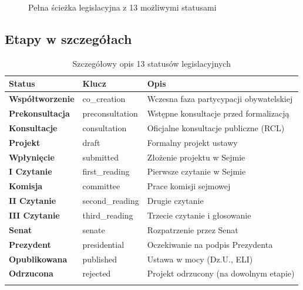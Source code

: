 \documentclass[12pt,a4paper]{article}
\begin{document}
\begin{figure}[H]
\caption{Pełna ścieżka legislacyjna z 13 możliwymi statusami}
\label{fig:legislative}
\end{figure}

\subsection{Etapy w szczegółach}

\begin{longtable}{>{\bfseries}l l p{8cm}}
\toprule
\textbf{Status} & \textbf{Klucz} & \textbf{Opis} \\
\midrule
\endhead
Współtworzenie & co\_creation & Wczesna faza partycypacji obywatelskiej \\
Prekonsultacja & preconsultation & Wstępne konsultacje przed formalizacją \\
Konsultacje & consultation & Oficjalne konsultacje publiczne (RCL) \\
Projekt & draft & Formalny projekt ustawy \\
Wpłynięcie & submitted & Złożenie projektu w Sejmie \\
I Czytanie & first\_reading & Pierwsze czytanie w Sejmie \\
Komisja & committee & Prace komisji sejmowej \\
II Czytanie & second\_reading & Drugie czytanie \\
III Czytanie & third\_reading & Trzecie czytanie i głosowanie \\
Senat & senate & Rozpatrzenie przez Senat \\
Prezydent & presidential & Oczekiwanie na podpis Prezydenta \\
Opublikowana & published & Ustawa w mocy (Dz.U., ELI) \\
Odrzucona & rejected & Projekt odrzucony (na dowolnym etapie) \\
\bottomrule
\caption{Szczegółowy opis 13 statusów legislacyjnych}
\end{longtable}

\newpage

\end{document}
